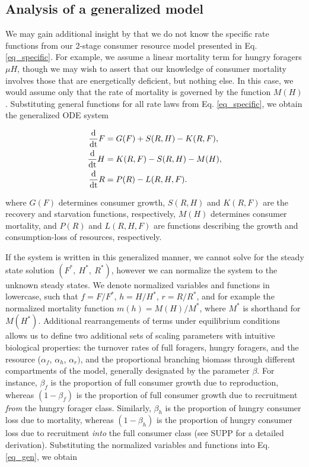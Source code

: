 \documentclass[12pt,english]{article}
\begin{document}
\begin{spacing}{1.9}
\subsection{Analysis of a generalized model}

We may gain additional insight by that we do not know the specific rate functions from our 2-stage consumer resource model presented in Eq. \ref{eq_specific}.
For example, we assume a linear mortality term for hungry foragers $\mu H$, though we may wish to assert that our knowledge of consumer mortality involves those that are energetically deficient, but nothing else.
In this case, we would assume only that the rate of mortality is governed by the function $M(H)$.
Substituting general functions for all rate laws from Eq. \ref{eq_specific}, we obtain the generalized ODE system

\begin{align}
\frac{\rm d}{\rm dt} F &= G(F) + S(R,H) - K(R,F), \nonumber \\
\frac{\rm d}{\rm dt} H &= K(R,F) - S(R,H) - M(H), \nonumber \\
\frac{\rm d}{\rm dt} R &= P(R) - L(R,H,F).
\label{eq_gen}
\end{align}

\noindent where $G(F)$ determines consumer growth, $S(R,H)$ and $K(R,F)$ are the recovery and starvation functions, respectively, $M(H)$ determines consumer mortality, and $P(R)$ and $L(R,H,F)$ are functions describing the growth and consumption-loss of resources, respectively.


If the system is written in this generalized manner, we cannot solve for the steady state solution $(F^*,~H^*,~R^*)$, however we can normalize the system to the unknown steady states.
We denote normalized variables and functions in lowercase, such that $f = F/F^*$, $h = H/H^*$, $r = R/R^*$, and for example the normalized mortality function $m(h) = M(H)/M^*$, where $M^*$ is shorthand for $M(H^*)$.
Additional rearrangements of terms under equilibrium conditions allows us to define two additional sets of scaling parameters with intuitive biological properties: the turnover rates of full foragers, hungry foragers, and the resource ($\alpha_f$, $\alpha_h$, $\alpha_r)$, and the proportional branching biomass through different compartments of the model, generally designated by the parameter $\beta$.
For instance, $\beta_f$ is the proportion of full consumer growth due to reproduction, whereas $(1-\beta_f)$ is the proportion of full consumer growth due to recruitment \emph{from} the hungry forager class.
Similarly, $\beta_h$ is the proportion of hungry consumer loss due to mortality, whereas $(1-\beta_h)$ is the proportion of hungry consumer loss due to recruitment \emph{into} the full consumer class (see SUPP for a detailed derivation).
Substituting the normalized variables and functions into Eq. \ref{eq_gen}, we obtain


\end{spacing}
\end{document}
